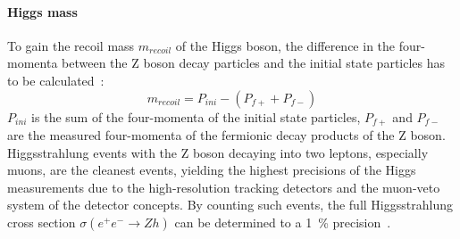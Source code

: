 \paragraph{Higgs mass}
To gain the recoil mass $m_{recoil}$ of the Higgs boson, the difference in the four-momenta between the Z boson decay particles and the initial state particles has to be calculated~\cite[cf. p. 7]{ILCPhysics}:
\begin{equation}
 m_{recoil}=P_{ini}-(P_{f+}+P_{f-})
\end{equation}
$P_{ini}$ is the sum of the four-momenta of the initial state particles, $P_{f+}$ and $P_{f-}$ are the measured four-momenta of the fermionic decay products of the Z boson.\\
Higgsstrahlung events with the Z boson decaying into two leptons, especially muons, are the cleanest events, yielding the highest precisions of the Higgs measurements due to the high-resolution tracking detectors and the muon-veto system of the detector concepts.
By counting such events, the full Higgsstrahlung cross section $\sigma(e^+e^-\rightarrow Zh)$ can be determined to a \SI{1}{\percent} precision~\cite[p. 12]{PhysicsCase}.


